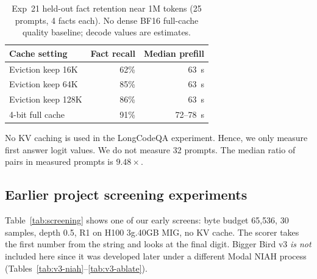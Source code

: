 \documentclass[11pt]{article}
\begin{document}
\begin{table}[ht]
  \centering
  \small
  \caption{Exp~21 held-out fact retention near 1M tokens (25 prompts,
  4 facts each). No dense BF16 full-cache quality baseline; decode values
  are estimates.}
  \label{tab:1m-exp21}
  \begin{tabular}{@{}lrr@{}}
    \toprule
    Cache setting & Fact recall & Median prefill \\
    \midrule
    Eviction keep 16K  & 62\% & 63~s \\
    Eviction keep 64K  & 85\% & 63~s \\
    Eviction keep 128K & 86\% & 63~s \\
    4-bit full cache   & 91\% & 72--78~s \\
    \bottomrule
  \end{tabular}
\end{table}



No KV caching is used in the LongCodeQA experiment. Hence, we only measure first answer logit values. We do not measure 32 prompts. The median ratio of pairs in measured prompts is $9.48\times$.


\subsection{Earlier project screening experiments}




Table~\ref{tab:screening} shows one of our early screens: byte budget
65{,}536, 30 samples, depth 0.5, R1 on H100 3g.40GB MIG, no KV cache.
The scorer takes the first number from the string and looks at the final digit. Bigger Bird v3 \emph{is not} included here since it was developed later under a different Modal NIAH process
(Tables~\ref{tab:v3-niah}--\ref{tab:v3-ablate}).
\end{document}
